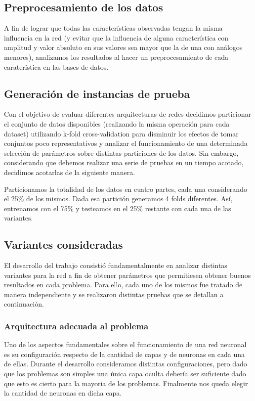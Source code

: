 \documentclass[informe.tex]{subfiles}
\begin{document}
    \vspace{15pt}

    
    
  \subsection{Preprocesamiento de los datos}
  
    A fin de lograr que todas las características observadas tengan la misma influencia en la red (y evitar que la influencia de alguna característica con amplitud y valor absoluto en sus valores sea mayor que la de una con análogos menores), analizamos los resultados al hacer un preprocesamiento de cada caraterística en las bases de datos.
    
  
  \subsection{Generación de instancias de prueba}

    Con el objetivo de evaluar diferentes arquitecturas de redes decidimos particionar el conjunto de datos disponibles (realizando la misma operación para cada dataset) utilizando k-fold cross-validation para disminuir los efectos de tomar conjuntos poco representativos y analizar el funcionamiento de una determinada selección de parámetros sobre distintas particiones de los datos. Sin embargo, considerando que debemos realizar una serie de pruebas en un tiempo acotado, decidimos acotarlas de la siguiente manera.
    
    Particionamos la totalidad de los datos en cuatro partes, cada una considerando el 25\% de los mismos. Dada esa partición generamos 4 folds diferentes. Así, entrenamos con el 75\% y testeamos en el 25\% restante con cada una de las variantes.
    
    
  \subsection{Variantes consideradas}

    El desarrollo del trabajo consisti\'o fundamentalmente en analizar distintas variantes para la red a fin de obtener par\'ametros que permitiesen obtener buenos resultados en cada problema. Para ello, cada uno de los mismos fue tratado de manera independiente y se realizaron distintas pruebas que se detallan a continuaci\'on.

    \subsubsection{Arquitectura adecuada al problema}
      Uno de los aspectos fundamentales sobre el funcionamiento de una red neuronal es su configuraci\'on respecto de la cantidad de capas y de neuronas en cada una de ellas. Durante el desarrollo consideramos distintas configuraciones, pero dado que los problemas son simples una \'unica capa oculta debería ser suficiente dado que esto es cierto para la mayoria de los problemas\cite{nnwithJava}. Finalmente nos queda elegir la cantidad de neuronas en dicha capa. 
      
\end{document}

